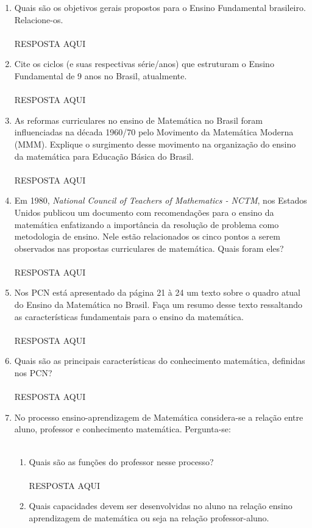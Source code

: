 \documentclass[a4paper, 12pt]{article}
\begin{document}
\begin{enumerate}
\item Quais são os objetivos gerais propostos para o Ensino Fundamental brasileiro. Relacione-os. \\ \\
  RESPOSTA AQUI
\item Cite os ciclos (e suas respectivas série/anos) que estruturam o Ensino Fundamental de 9 anos no Brasil, atualmente. \\ \\
  RESPOSTA AQUI
\item As reformas curriculares no ensino de Matemática no Brasil foram influenciadas na década 1960/70 pelo Movimento da Matemática Moderna (MMM). Explique o surgimento desse movimento na organização do ensino da matemática para Educação Básica do Brasil. \\ \\
  RESPOSTA AQUI
\item Em 1980, \textit{National Council of Teachers of Mathematics - NCTM}, nos Estados Unidos publicou um documento com recomendações para o ensino da matemática enfatizando a importância da resolução de problema como metodologia de ensino. Nele estão relacionados os cinco pontos a serem observados nas propostas curriculares de matemática. Quais foram eles? \\ \\
  RESPOSTA AQUI
\item Nos PCN está apresentado da página 21 à 24 um texto sobre o quadro atual do Ensino da Matemática no Brasil. Faça um resumo desse texto ressaltando as características fundamentais para o ensino da matemática. \\ \\
  RESPOSTA AQUI
\item Quais são as principais características do conhecimento matemática, definidas nos PCN? \\ \\
   RESPOSTA AQUI
\item No processo ensino-aprendizagem de Matemática considera-se a relação entre aluno, professor e conhecimento matemática. Pergunta-se: \\ \\ 
  \begin{enumerate}
  \item Quais são as funções do professor nesse processo? \\ \\
     RESPOSTA AQUI
   \item Quais capacidades devem ser desenvolvidas no aluno na relação ensino aprendizagem de matemática ou seja na relação professor-aluno. \\ \\

\end{enumerate}
\end{enumerate}
\end{document}
